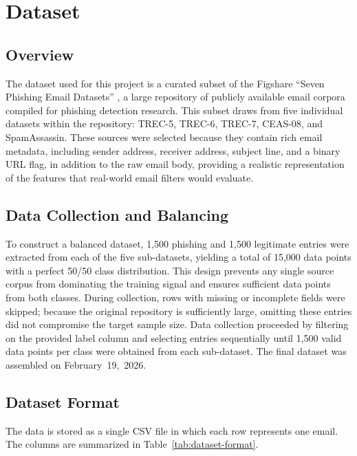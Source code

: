 \documentclass[11pt]{article}
\begin{document}
\section{Dataset}

\subsection{Overview}
The dataset used for this project is a curated subset of the Figshare ``Seven Phishing Email Datasets'' \citep{Champa2024}, a large repository of publicly available email corpora compiled for phishing detection research. This subset draws from five individual datasets within the repository: TREC-5, TREC-6, TREC-7, CEAS-08, and SpamAssassin. These sources were selected because they contain rich email metadata, including sender address, receiver address, subject line, and a binary URL flag, in addition to the raw email body, providing a realistic representation of the features that real-world email filters would evaluate.

\subsection{Data Collection and Balancing}
To construct a balanced dataset, 1,500 phishing and 1,500 legitimate entries were extracted from each of the five sub-datasets, yielding a total of 15,000 data points with a perfect 50/50 class distribution. This design prevents any single source corpus from dominating the training signal and ensures sufficient data points from both classes. During collection, rows with missing or incomplete fields were skipped; because the original repository is sufficiently large, omitting these entries did not compromise the target sample size. Data collection proceeded by filtering on the provided label column and selecting entries sequentially until 1,500 valid data points per class were obtained from each sub-dataset. The final dataset was assembled on February~19,~2026.

\subsection{Dataset Format}
The data is stored as a single CSV file in which each row represents one email. The columns are summarized in Table~\ref{tab:dataset-format}.
\end{document}
